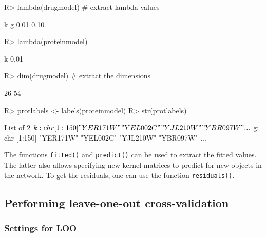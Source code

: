 \documentclass[
]{article}
\begin{document}
\begin{CodeChunk}

\begin{CodeInput}
R> lambda(drugmodel)  # extract lambda values
\end{CodeInput}

\begin{CodeOutput}
   k    g 
0.01 0.10 
\end{CodeOutput}

\begin{CodeInput}
R> lambda(proteinmodel)
\end{CodeInput}

\begin{CodeOutput}
   k 
0.01 
\end{CodeOutput}

\begin{CodeInput}
R> dim(drugmodel) # extract the dimensions
\end{CodeInput}

\begin{CodeOutput}
[1] 26 54
\end{CodeOutput}

\begin{CodeInput}
R> protlabels <- labels(proteinmodel)
R> str(protlabels)
\end{CodeInput}

\begin{CodeOutput}
List of 2
 $ k: chr [1:150] "YER171W" "YEL002C" "YJL210W" "YBR097W" ...
 $ g: chr [1:150] "YER171W" "YEL002C" "YJL210W" "YBR097W" ...
\end{CodeOutput}
\end{CodeChunk}

The functions \texttt{fitted()} and \texttt{predict()} can be used to
extract the fitted values. The latter also allows specifying new kernel
matrices to predict for new objects in the network. To get the
residuals, one can use the function \texttt{residuals()}.

\hypertarget{performing-leave-one-out-cross-validation}{%
\subsection{Performing leave-one-out
cross-validation}\label{performing-leave-one-out-cross-validation}}

\hypertarget{settings-for-loo}{%
\subsubsection{Settings for LOO}\label{settings-for-loo}}
\end{document}
